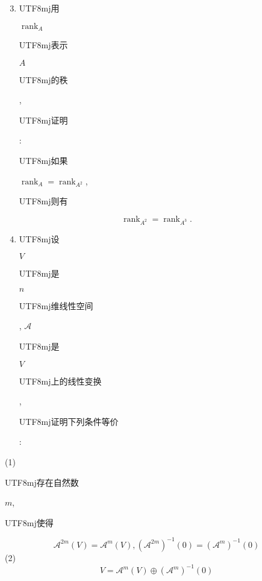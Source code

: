 \documentclass[10pt]{article}
\begin{document}
\begin{enumerate}
  \setcounter{enumi}{2}
  \item \begin{CJK}{UTF8}{mj}用\end{CJK} $\operatorname{rank}_{A}$ \begin{CJK}{UTF8}{mj}表示\end{CJK} $A$ \begin{CJK}{UTF8}{mj}的秩\end{CJK}, \begin{CJK}{UTF8}{mj}证明\end{CJK}: \begin{CJK}{UTF8}{mj}如果\end{CJK} $\operatorname{rank}_{A}=\operatorname{rank}_{A^{2}}$, \begin{CJK}{UTF8}{mj}则有\end{CJK}
\end{enumerate}
$$
\operatorname{rank}_{A^{2}}=\operatorname{rank}_{A^{3}} .
$$

\begin{enumerate}
  \setcounter{enumi}{3}
  \item \begin{CJK}{UTF8}{mj}设\end{CJK} $V$ \begin{CJK}{UTF8}{mj}是\end{CJK} $n$ \begin{CJK}{UTF8}{mj}维线性空间\end{CJK}, $\mathscr{A}$ \begin{CJK}{UTF8}{mj}是\end{CJK} $V$ \begin{CJK}{UTF8}{mj}上的线性变换\end{CJK}, \begin{CJK}{UTF8}{mj}证明下列条件等价\end{CJK}:
\end{enumerate}
(1) \begin{CJK}{UTF8}{mj}存在自然数\end{CJK} $m$, \begin{CJK}{UTF8}{mj}使得\end{CJK}
$$
\mathscr{A}^{2 m}(V)=\mathscr{A}^{m}(V),\left(\mathscr{A}^{2 m}\right)^{-1}(0)=\left(\mathscr{A}^{m}\right)^{-1}(0)
$$
(2)
$$
V=\mathscr{A}^{m}(V) \oplus\left(\mathscr{A}^{m}\right)^{-1}(0)
$$
\end{document}
